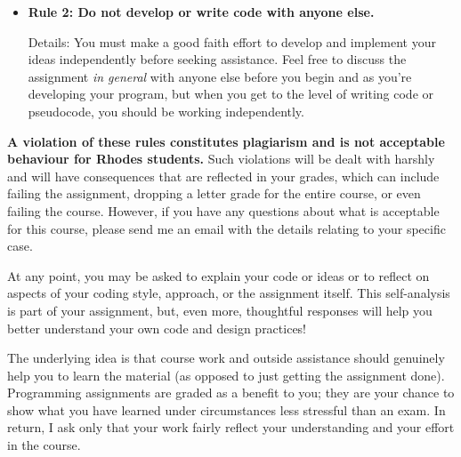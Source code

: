 \documentclass [letterpaper,11pt]{article}
\begin{document}
\begin{description}
\begin{itemize}
\begin{itemize}
                \item \textbf{Rule 2: Do not develop or write code with anyone else.}
                
                Details: You must make a good faith effort to develop and implement your ideas
                independently before seeking assistance.  Feel free to discuss the assignment \emph{in general} with anyone else
                before you begin and as you're developing your program, but when you get to the level of writing code or
                pseudocode, you should be working independently.
                
                        \end{itemize}
        
\textbf{A violation of these rules constitutes plagiarism and is not acceptable behaviour for Rhodes
students.} Such violations will be dealt with harshly and will have consequences that are
reflected in your grades, which can include failing the assignment, dropping a letter grade for
the entire course, or even failing the course. However, if you have any questions about what
is acceptable for this course, please send me an email with the details relating to your specific
case.

At any point, you may be asked to explain your code or ideas or to reflect on aspects of your
coding style, approach, or the assignment itself. This self-analysis is part of your assignment,
but, even more, thoughtful responses will help you better understand your own code and
design practices!

The underlying idea is that course work and outside assistance should genuinely help you to
learn the material (as opposed to just getting the assignment done). Programming assignments
are graded as a benefit to you; they are your chance to show what you have learned
under circumstances less stressful than an exam. In return, I ask only that your work fairly
reflect your understanding and your effort in the course.
        \end{itemize}


\end{description}
\end{document}

